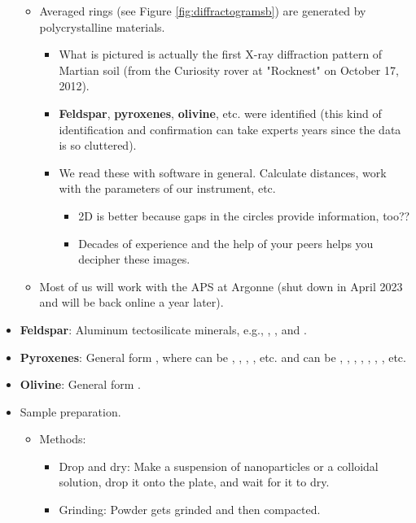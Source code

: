 \documentclass[../notes.tex]{subfiles}
\begin{document}
\begin{itemize}
\begin{itemize}
\begin{itemize}
        \end{itemize}
        \item Averaged rings (see Figure \ref{fig:diffractogramsb}) are generated by polycrystalline materials.
        \begin{itemize}
            \item What is pictured is actually the first X-ray diffraction pattern of Martian soil (from the Curiosity rover at "Rocknest" on October 17, 2012).
            \item \textbf{Feldspar}, \textbf{pyroxenes}, \textbf{olivine}, etc. were identified (this kind of identification and confirmation can take experts years since the data is so cluttered).
            \item We read these with software in general. Calculate distances, work with the parameters of our instrument, etc.
            \begin{itemize}
                \item 2D is better because gaps in the circles provide information, too??
                \item Decades of experience and the help of your peers helps you decipher these images.
            \end{itemize}
        \end{itemize}
        \item Most of us will work with the APS at Argonne (shut down in April 2023 and will be back online a year later).
    \end{itemize}
    \item \textbf{Feldspar}: Aluminum tectosilicate minerals, e.g., , , and .
    \item \textbf{Pyroxenes}: General form , where  can be , , , , etc. and  can be , , , , , , , etc.
    \item \textbf{Olivine}: General form .
    \item Sample preparation.
    \begin{itemize}
        \item Methods:
        \begin{itemize}
            \item Drop and dry: Make a suspension of nanoparticles or a colloidal solution, drop it onto the plate, and wait for it to dry.
            \item Grinding: Powder gets grinded and then compacted.

\end{itemize}
\end{itemize}
\end{itemize}
\end{document}
